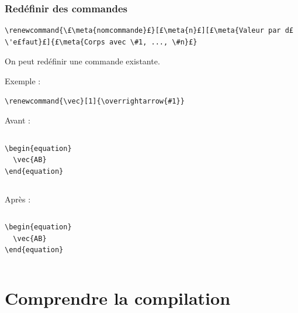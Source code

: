 \documentclass{beamer}
\begin{document}
\begin{frame}[fragile]
  \frametitle{Redéfinir des commandes}

\begin{lstlisting}
\renewcommand{\£\meta{nomcommande}£}[£\meta{n}£][£\meta{Valeur par d£\'e£faut}£]{£\meta{Corps avec \#1, ..., \#n}£}
\end{lstlisting}
On peut redéfinir une commande existante.

\bigskip
Exemple :
\begin{lstlisting}
\renewcommand{\vec}[1]{\overrightarrow{#1}}
\end{lstlisting}

\bigskip
Avant :
\begin{columns}
\begin{column}{.45\textwidth}
\begin{lstlisting}
\begin{equation}
  \vec{AB}
\end{equation}
\end{lstlisting}
\end{column}
\begin{column}{.45\textwidth}
\end{column}
\end{columns}

\renewcommand{\vec}[1]{\overrightarrow{#1}}

\bigskip
Après :
\begin{columns}
\begin{column}{.45\textwidth}
\begin{lstlisting}
\begin{equation}
  \vec{AB}
\end{equation}
\end{lstlisting}
\end{column}
\begin{column}{.45\textwidth}
\myex{%
\begin{equation}
  \vec{AB}
\end{equation}
}
\end{column}
\end{columns}

\end{frame}



\section{Comprendre la compilation}
\end{document}
